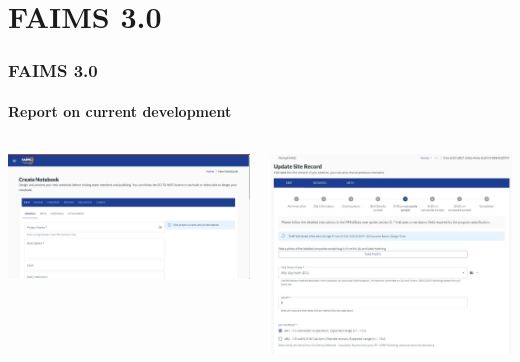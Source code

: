 

\section{FAIMS 3.0}

\begin{sectionframe} %
	\frametitle{FAIMS 3.0}
	\framesubtitle{Report on current development}



\vfill
\begin{columns}[T]

\begin{column}{0.55\textwidth}
\centering
\includegraphics[width=\textwidth]{Images/Screenshot_20211209_123600_Selection_001.png}
\end{column}
\begin{column}{0.35\textwidth}
\centering
\includegraphics[width=\textwidth]{Images/Screenshot 2022-03-04 182606.jpg} 
\end{column}

\end{columns}

\end{sectionframe}

